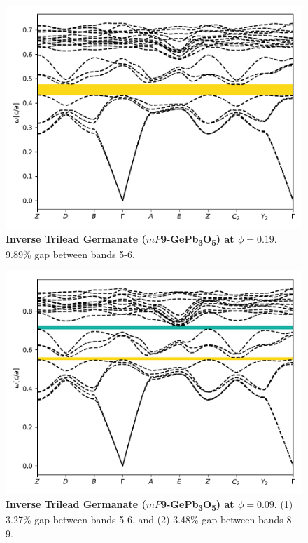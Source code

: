 \documentclass[fleqn,amsmath,amssymb,superscriptaddress, reprint,prl]{revtex4-1}
\begin{document}
\begin{figure}
\includegraphics[width=0.9\linewidth]{workspace/3e968b4447b17f87f867ca67fb867f91/images/r=31.pdf}
	\caption{\textbf{Inverse Trilead Germanate ($mP$9-GePb\textsubscript{3}O\textsubscript{5}) at $\phi=0.19$}. 9.89\% gap between bands 5-6.}
\end{figure}

\begin{figure}
\includegraphics[width=0.9\linewidth]{workspace/3e968b4447b17f87f867ca67fb867f91/images/r=34.pdf}
	\caption{\textbf{Inverse Trilead Germanate ($mP$9-GePb\textsubscript{3}O\textsubscript{5}) at $\phi=0.09$}. (1) 3.27\% gap between bands 5-6, and (2) 3.48\% gap between bands 8-9.}
\end{figure}
\end{document}
